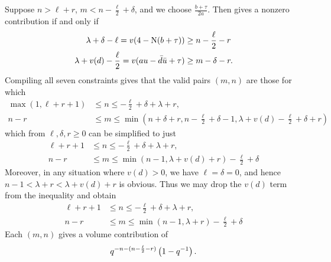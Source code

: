 \begin{description}
Suppose $n > \ell + r$,
$m < n - \frac{\ell}{2} + \delta$, and we choose $\frac{b+\tau}{2a}$.
Then  gives a nonzero contribution if and only if
\begin{align*}
  \lambda + \delta - \ell = v(4-\operatorname{N}(b+\tau)) &\geq n - \frac{\ell}{2} - r \\
  \lambda + v(d) - \frac{\ell}{2} = v(au-\bar d \bar u + \tau) & \geq m - \delta - r.
\end{align*}
Compiling all seven constraints gives that the valid pairs $(m,n)$ are those for which
\begin{align*}
  \max(1, \ell+r+1) &\leq n \leq -\frac{\ell}{2} + \delta + \lambda + r, \\
  n-r &\leq m \leq \min\left( n+\delta+r, n - \frac{\ell}{2}+\delta - 1,
    \lambda + v(d) -\frac{\ell}{2}+\delta+r \right)
\end{align*}
which from $\ell, \delta, r \ge 0$ can be simplified to just
\begin{align*}
  \ell+r+1 &\leq n \leq  -\frac{\ell}{2} + \delta + \lambda + r, \\
  n-r &\leq m \leq \min(n-1, \lambda + v(d) + r) - \frac{\ell}{2} + \delta
\end{align*}
Moreover, in any situation where $v(d) > 0$, we have $\ell = \delta = 0$,
and hence $n-1 < \lambda + r < \lambda + v(d) + r$ is obvious.
Thus we may drop the $v(d)$ term from the inequality and obtain
\begin{equation}
  \begin{aligned}
    \ell+r+1 &\leq n \leq  -\frac{\ell}{2} + \delta + \lambda + r, \\
    n-r &\leq m \leq \min(n-1, \lambda + r) - \frac{\ell}{2} + \delta
  \end{aligned}
  \label{eq:even_case3_plus}
\end{equation}
Each $(m,n)$ gives a volume contribution of
\[ q^{-n - (n - \frac{\ell}{2} - r)} \left( 1 - q^{-1} \right). \]


\end{description}
